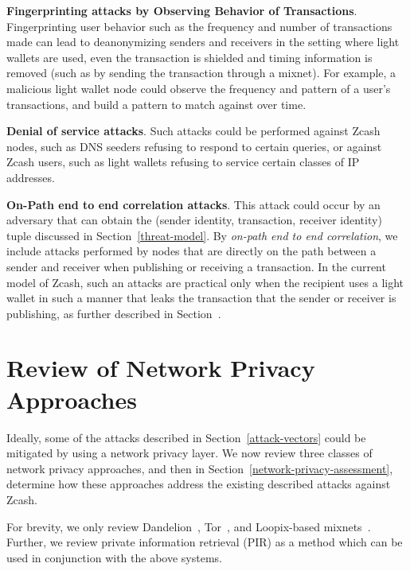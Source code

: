 \documentclass{article}
\begin{document}
\textbf{Fingerprinting attacks by Observing Behavior of Transactions}.
Fingerprinting user behavior such as the frequency and number of transactions
made can lead to deanonymizing senders and receivers in the setting where light
wallets are used, even the transaction is shielded and timing information is
removed (such as by sending the transaction through a mixnet).
For example, a malicious light wallet node could observe
the frequency and pattern of a user’s transactions, and build a pattern to
match against over time.

\textbf{Denial of service attacks}. Such attacks could be performed against
Zcash nodes, such as DNS seeders refusing to respond to certain queries, or
against Zcash users, such as light wallets refusing to service certain classes
of IP addresses.

\textbf{On-Path end to end correlation attacks}. This attack could occur by an
adversary that can obtain the (sender identity, transaction, receiver identity)
tuple discussed in Section~\ref{threat-model}. By \emph{on-path end to end
correlation}, we include attacks performed by nodes that are directly on the
path between a sender and receiver when publishing or receiving a transaction.
In the current model of Zcash, such an attacks are practical
only when the recipient uses a light wallet in such a manner that leaks the
transaction that the sender or receiver is publishing, as further described in
Section~\cite{light-wallet-spec}.


\section{Review of Network Privacy Approaches}
\label{network-privacy-review}

Ideally, some of the attacks described in Section~\ref{attack-vectors} could be
mitigated by using a network privacy layer. We now review three
classes of network privacy approaches, and then in
Section~\ref{network-privacy-assessment}, determine how these approaches
address the existing described attacks against Zcash.

For brevity, we only review
Dandelion~\cite{Fanti:2018:DLC,BojjaVenkatakrishnan:2017:DRB},
Tor~\cite{tor-specification}, and
Loopix-based mixnets~\cite{Piotrowska:2017:LAS}.
Further, we review private information retrieval (PIR) as a method which can be
used in conjunction with the above systems.
\end{document}
